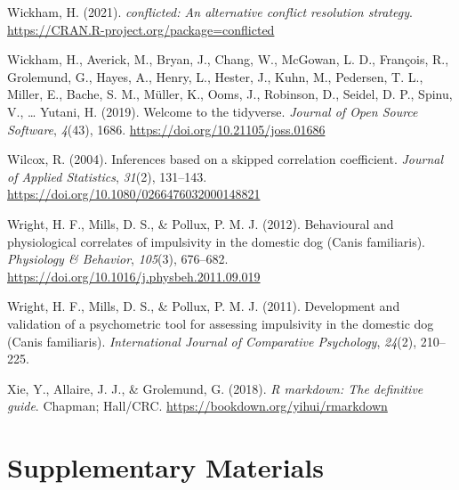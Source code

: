\documentclass[
  pub,floatsintext]{apa6}
\newlength{\cslhangindent}
\newlength{\cslentryspacingunit} %
\newenvironment{CSLReferences}[2] %
 {%
  \setlength{\parindent}{0pt}
  \ifodd #1
  \let\oldpar\par
  \def\par{\hangindent=\cslhangindent\oldpar}
  \fi
  \setlength{\parskip}{#2\cslentryspacingunit}
 }%
 {}
\begin{document}
\begin{CSLReferences}{1}{0}
\leavevmode{}%
Wickham, H. (2021). \emph{{conflicted}: An alternative conflict resolution strategy}. \url{https://CRAN.R-project.org/package=conflicted}

\leavevmode{}%
Wickham, H., Averick, M., Bryan, J., Chang, W., McGowan, L. D., François, R., Grolemund, G., Hayes, A., Henry, L., Hester, J., Kuhn, M., Pedersen, T. L., Miller, E., Bache, S. M., Müller, K., Ooms, J., Robinson, D., Seidel, D. P., Spinu, V., \ldots{} Yutani, H. (2019). Welcome to the {tidyverse}. \emph{Journal of Open Source Software}, \emph{4}(43), 1686. \url{https://doi.org/10.21105/joss.01686}

\leavevmode{}%
Wilcox, R. (2004). Inferences based on a skipped correlation coefficient. \emph{Journal of Applied Statistics}, \emph{31}(2), 131--143. \url{https://doi.org/10.1080/0266476032000148821}

\leavevmode{}%
Wright, H. F., Mills, D. S., \& Pollux, P. M. J. (2012). Behavioural and physiological correlates of impulsivity in the domestic dog ({Canis} familiaris). \emph{Physiology \& Behavior}, \emph{105}(3), 676--682. \url{https://doi.org/10.1016/j.physbeh.2011.09.019}

\leavevmode{}%
Wright, H. F., Mills, D. S., \& Pollux, P. M. J. (2011). Development and validation of a psychometric tool for assessing impulsivity in the domestic dog ({Canis} familiaris). \emph{International Journal of Comparative Psychology}, \emph{24}(2), 210--225.

\leavevmode{}%
Xie, Y., Allaire, J. J., \& Grolemund, G. (2018). \emph{R markdown: The definitive guide}. Chapman; Hall/CRC. \url{https://bookdown.org/yihui/rmarkdown}

\end{CSLReferences}

\endgroup

\clearpage

\hypertarget{supplementary-materials}{%
\section{Supplementary Materials}\label{supplementary-materials}}

\renewcommand{\thetable}{S\arabic{table}}
\setcounter{table}{0}
\renewcommand{\thefigure}{S\arabic{figure}}
\setcounter{figure}{0}
\setcounter{page}{1}
\singlespacing
\end{document}
